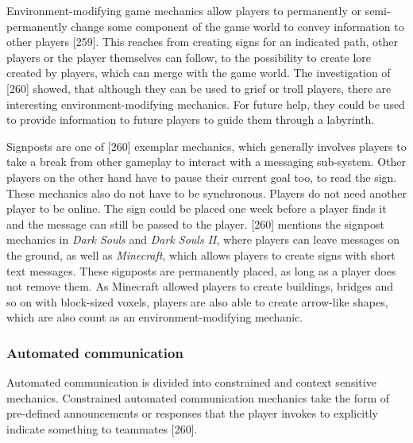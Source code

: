 Environment-modifying game mechanics allow players to permanently or semi-permanently change some component of the game world to convey information to other players \autocite{Toups2014ATheory}[259].
This reaches from creating signs for an indicated path, other players or the player themselves can follow, to the possibility to create lore created by players, which can merge with the game world. The investigation of \textcite{Toups2014ATheory}[260] showed, that although they can be used to grief or troll players, there are interesting environment-modifying mechanics.
For future help, they could be used to provide information to future players to guide them through a labyrinth.

Signposts are one of \textcite{Toups2014ATheory}[260] exemplar mechanics, which generally involves players to take a break from other gameplay to interact with a messaging sub-system. Other players on the other hand have to pause their current goal too, to read the sign. These mechanics also do not have to be synchronous.
Players do not need another player to be online. The sign could be placed one week before a player finds it and the message can still be passed to the player. \textcite{Cheung2012CommunicationGaming}[260] mentions the signpost mechanics in \textit{Dark Souls} and \textit{Dark Souls II}, where players can leave messages on the ground, as well as \textit{Minecraft}, which allows players to create signs with short text messages. These signposts are permanently placed, as long as a player does not remove them. As Minecraft allowed players to create buildings, bridges and so on with block-sized voxels, players are also able to create arrow-like shapes, which are also count as an environment-modifying mechanic.


\subsubsection{Automated communication}
\label{section:Automated communication}

Automated communication is divided into constrained and context sensitive mechanics.
Constrained automated communication mechanics take the form of pre-defined announcements or responses that the player invokes to explicitly indicate something to teammates \autocite{Toups2014ATheory}[260].

